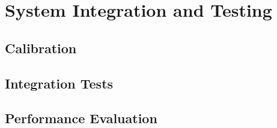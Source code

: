 \chapter{System Integration and Testing}
\label{chap:testing}

\setcounter{section}{0}
\setcounter{subsection}{0}

\section{Calibration}
\label{sec:calibration}


\section{Integration Tests}
\label{sec:integration}


\section{Performance Evaluation}
\label{sec:performance}



